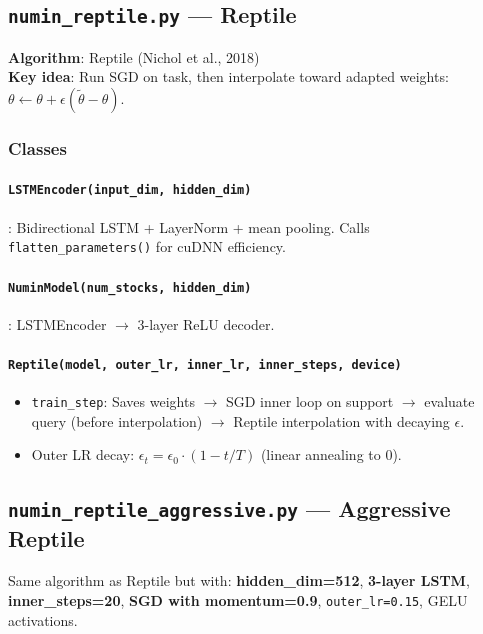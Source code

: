 \documentclass[11pt,a4paper]{article}
\begin{document}
\subsection{\texttt{numin\_reptile.py} --- Reptile}
\textbf{Algorithm}: Reptile (Nichol et al., 2018)\\
\textbf{Key idea}: Run SGD on task, then interpolate toward adapted weights: $\theta \leftarrow \theta + \epsilon(\tilde{\theta} - \theta)$.

\subsubsection{Classes}
\paragraph{\texttt{LSTMEncoder(input\_dim, hidden\_dim)}}: Bidirectional LSTM + LayerNorm + mean pooling. Calls \texttt{flatten\_parameters()} for cuDNN efficiency.

\paragraph{\texttt{NuminModel(num\_stocks, hidden\_dim)}}: LSTMEncoder $\to$ 3-layer ReLU decoder.

\paragraph{\texttt{Reptile(model, outer\_lr, inner\_lr, inner\_steps, device)}}
\begin{itemize}[nosep]
  \item \texttt{train\_step}: Saves weights $\to$ SGD inner loop on support $\to$ evaluate query (before interpolation) $\to$ Reptile interpolation with decaying $\epsilon$.
  \item Outer LR decay: $\epsilon_t = \epsilon_0 \cdot (1 - t/T)$ (linear annealing to 0).
\end{itemize}

\subsection{\texttt{numin\_reptile\_aggressive.py} --- Aggressive Reptile}
Same algorithm as Reptile but with: \textbf{hidden\_dim=512}, \textbf{3-layer LSTM}, \textbf{inner\_steps=20}, \textbf{SGD with momentum=0.9}, \texttt{outer\_lr=0.15}, GELU activations.
\end{document}
